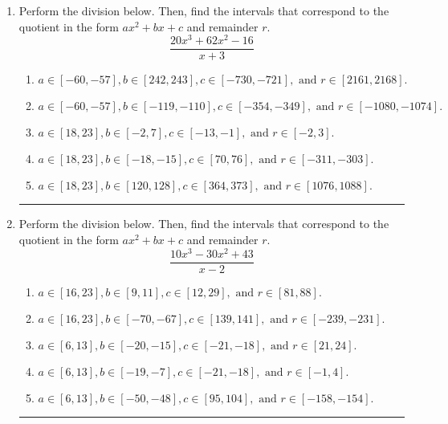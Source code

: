 \documentclass[14pt]{extbook}
\newcommand{\litem}[1]{\item#1\hspace*{-1cm}\rule{\textwidth}{0.4pt}}
\begin{document}
\begin{enumerate}
{\begin{enumerate}[label=\Alph*.]
\end{enumerate} }
\litem{
Perform the division below. Then, find the intervals that correspond to the quotient in the form $ax^2+bx+c$ and remainder $r$.\[ \frac{20x^{3} +62 x^{2} -16}{x + 3} \]\begin{enumerate}[label=\Alph*.]
\item \( a \in [-60, -57], b \in [242, 243], c \in [-730, -721], \text{ and } r \in [2161, 2168]. \)
\item \( a \in [-60, -57], b \in [-119, -110], c \in [-354, -349], \text{ and } r \in [-1080, -1074]. \)
\item \( a \in [18, 23], b \in [-2, 7], c \in [-13, -1], \text{ and } r \in [-2, 3]. \)
\item \( a \in [18, 23], b \in [-18, -15], c \in [70, 76], \text{ and } r \in [-311, -303]. \)
\item \( a \in [18, 23], b \in [120, 128], c \in [364, 373], \text{ and } r \in [1076, 1088]. \)

\end{enumerate} }
\litem{
Perform the division below. Then, find the intervals that correspond to the quotient in the form $ax^2+bx+c$ and remainder $r$.\[ \frac{10x^{3} -30 x^{2} + 43}{x -2} \]\begin{enumerate}[label=\Alph*.]
\item \( a \in [16, 23], b \in [9, 11], c \in [12, 29], \text{ and } r \in [81, 88]. \)
\item \( a \in [16, 23], b \in [-70, -67], c \in [139, 141], \text{ and } r \in [-239, -231]. \)
\item \( a \in [6, 13], b \in [-20, -15], c \in [-21, -18], \text{ and } r \in [21, 24]. \)
\item \( a \in [6, 13], b \in [-19, -7], c \in [-21, -18], \text{ and } r \in [-1, 4]. \)
\item \( a \in [6, 13], b \in [-50, -48], c \in [95, 104], \text{ and } r \in [-158, -154]. \)


\end{enumerate}}
\end{enumerate}
\end{document}
